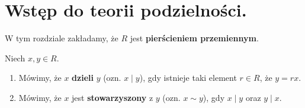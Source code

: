 \section{Wstęp do teorii podzielności.}
 
\begin{context}
    W tym rozdziale zakładamy, że $R$ jest \textbf{pierścieniem przemiennym}.
\end{context}

\begin{definition}
    Niech $x, y \in R$. 
    \begin{enumerate}[label=\arabic*)]
        \item Mówimy, że $x$ \textbf{dzieli} $y$ (ozn. $x \mid y$), gdy istnieje taki element $r \in R$, że $y = rx$.
        \item Mówimy, że $x$ jest \textbf{stowarzyszony} z $y$ (ozn. $x \sim y$), gdy $x \mid y$ oraz $y \mid x$.
    \end{enumerate}
\end{definition}

